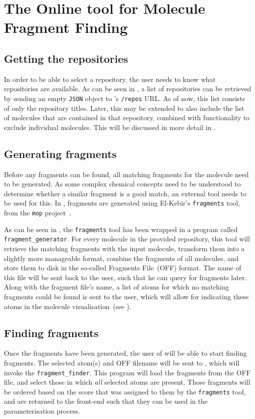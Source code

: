 %

\section[\omfraf]{The Online tool for Molecule Fragment Finding}
\subsection{Getting the repositories}
In order to be able to select a repository, the user needs to know what repositories are available. As can be seen in , a list of repositories can be retrieved by sending an empty \verb|JSON| object to \omfraf's \verb|/repos| URL. As of now, this list consists of only the repository titles. Later, this may be extended to also include the list of molecules that are contained in that repository, combined with functionality to exclude individual molecules. This will be discussed in more detail in .

\subsection{Generating fragments}
Before any fragments can be found, all matching fragments for the molecule need to be generated. As some complex chemical concepts need to be understood to determine whether a similar fragment is a good match, an external tool needs to be used for this. In \omfraf, fragments are generated using El-Kebir's \verb|fragments| tool, from the \verb|mop| project~\cite{elkebir2014molecule}.

As can be seen in , the \verb|fragments| tool has been wrapped in a program called \verb|fragment_generator|. For every molecule in the provided repository, this tool will retrieve the matching fragments with the input molecule, transform them into a slightly more manageable format, combine the fragments of all molecules, and store them to disk in the so-called \omfraf{} Fragments File~(OFF) format. The name of this file will be sent back to the \oframp{} user, such that he can query for fragments later. Along with the fragment file's name, a list of atoms for which no matching fragments could be found is sent to the user, which will allow for indicating these atoms in the molecule visualisation~(see ).

%

\subsection{Finding fragments}
Once the fragments have been generated, the user of \oframp{} will be able to start finding fragments. The selected atom(s) and OFF filename will be sent to \omfraf, which will invoke the \verb|fragment_finder|. This program will load the fragments from the OFF file, and select those in which \emph{all} selected atoms are present. Those fragments will be ordered based on the score that was assigned to them by the \verb|fragments| tool, and are returned to the \oframp{} front-end such that they can be used in the parameterisation process.
